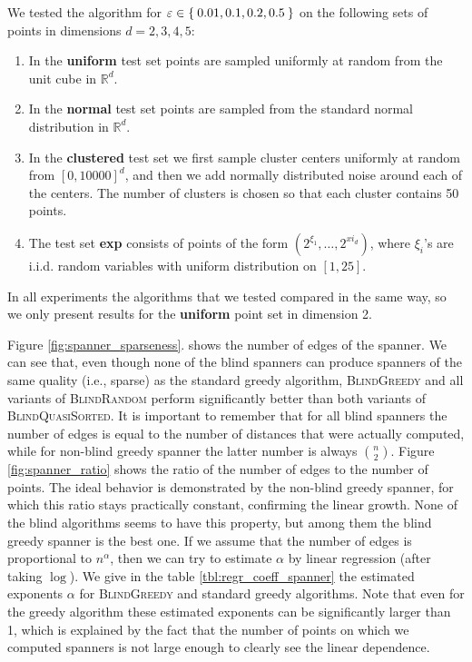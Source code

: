 \documentclass[a4paper,USenglish]{socg-lipics-v2018}
\newcommand{\eps}{\varepsilon}
\begin{document}


We tested the algorithm for $\eps \in \Set{0.01, 0.1, 0.2, 0.5}$ on the following sets of points in dimensions $d = 2,3,4,5$:
\begin{enumerate}
    \item In the \textbf{uniform} test set points are sampled uniformly at
        random from the unit cube in $\mathbb{R}^d$.
    \item In the \textbf{normal} test set points are sampled from the standard
        normal distribution in $\mathbb{R}^d$.
    \item In the \textbf{clustered} test set we first sample cluster centers uniformly 
        at random from $[0,10000]^d$, and then we add normally distributed noise around
        each of the centers. The number of clusters is chosen so that each cluster
        contains 50 points.
    \item The test set \textbf{exp} consists of points of the form $(2^{\xi_1}, \dots, 2^{xi_d})$,
        where $\xi_i$'s are i.i.d. random variables with uniform distribution on $[1,25]$.
\end{enumerate}
In all experiments the algorithms that we tested compared in the same way,
so we only present results for the \textbf{uniform} point set in dimension 2.

Figure \ref{fig:spanner_sparseness}.
shows the number of edges of the spanner.
We can see that, even though none of the blind spanners can produce
spanners of the same quality (i.e., sparse) as the standard greedy algorithm,
\textsc{BlindGreedy} and all variants of \textsc{BlindRandom}
perform significantly better than both variants of \textsc{BlindQuasiSorted}.
It is important to remember that for all blind spanners the number of edges
is equal to the number of distances that were actually computed, while
for non-blind greedy spanner the latter number is always $n \choose 2$.
Figure \ref{fig:spanner_ratio} shows the ratio of the number of edges to the number of points.
The ideal behavior is demonstrated by the non-blind greedy spanner,
for which this ratio stays practically constant, confirming the linear growth.
None of the blind algorithms seems to have this property, but among them
the blind greedy spanner is the best one. If we assume that the number of edges
is proportional to $n^\alpha$, then we can try to estimate $\alpha$ by 
linear regression (after taking $\log$).  We give in the table \ref{tbl:regr_coeff_spanner}
the estimated exponents $\alpha$ for \textsc{BlindGreedy} and standard
greedy algorithms. Note that even for the greedy algorithm these estimated
exponents can be significantly larger than 1,
which is explained by the fact that the number of points
on which we computed spanners is not large enough to clearly see
the linear dependence.
\end{document}

